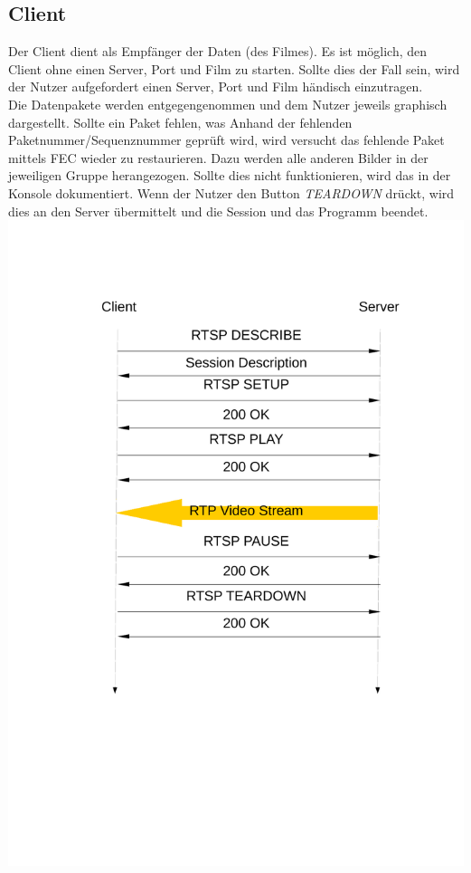 \subsection{Client}
Der Client dient als Empfänger der Daten (des Filmes). Es ist möglich, den Client ohne einen Server, Port und Film zu starten. Sollte dies der Fall sein, wird der Nutzer aufgefordert einen Server, Port und Film händisch einzutragen. \\
Die Datenpakete werden entgegengenommen und dem Nutzer jeweils graphisch dargestellt. Sollte ein Paket fehlen, was Anhand der fehlenden Paketnummer/Sequenznummer geprüft wird, wird versucht das fehlende Paket mittels FEC wieder zu restaurieren. Dazu werden alle anderen Bilder in der jeweiligen Gruppe herangezogen. Sollte dies nicht funktionieren, wird das in der Konsole dokumentiert. \ret
Wenn der Nutzer den Button \textit{TEARDOWN} drückt, wird dies an den Server übermittelt und die Session und das Programm beendet. \ret
\includegraphics[scale=0.45]{handshake01.pdf} \newline


